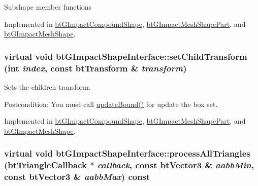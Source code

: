 Subshape member functions 

Implemented in \hyperlink{classbt_g_impact_compound_shape_861967c52cb52a358b8d99aa4c65e306}{btGImpactCompoundShape}, \hyperlink{classbt_g_impact_mesh_shape_part_5ff615b55a2bdaeba511fb116a9ab546}{btGImpactMeshShapePart}, and \hyperlink{classbt_g_impact_mesh_shape_cd958461b4f7802e5bceed2db87c4ff0}{btGImpactMeshShape}.\hypertarget{classbt_g_impact_shape_interface_83392f97bd7dfeb71ccdce6913a465b0}{
\subsubsection[setChildTransform]{\setlength{\rightskip}{0pt plus 5cm}virtual void btGImpactShapeInterface::setChildTransform (int {\em index}, \/  const btTransform \& {\em transform})}}
\label{classbt_g_impact_shape_interface_83392f97bd7dfeb71ccdce6913a465b0}


Sets the children transform. 

\begin{Desc}
\item[Postcondition:]You must call \hyperlink{classbt_g_impact_shape_interface_cb26c2d7a2aecabd06b996b72b848492}{updateBound()} for update the box set. \end{Desc}


Implemented in \hyperlink{classbt_g_impact_compound_shape_560410e20842ad73227d7712a574385c}{btGImpactCompoundShape}, \hyperlink{classbt_g_impact_mesh_shape_part_0a97d3769fb7d3f583e41da6b284bcc1}{btGImpactMeshShapePart}, and \hyperlink{classbt_g_impact_mesh_shape_274feed3c9a38a6af5c9f1141ae9ac1a}{btGImpactMeshShape}.\hypertarget{classbt_g_impact_shape_interface_2faf9adce39854a9a66dd658f646be25}{
\subsubsection[processAllTriangles]{\setlength{\rightskip}{0pt plus 5cm}virtual void btGImpactShapeInterface::processAllTriangles ({\bf btTriangleCallback} $\ast$ {\em callback}, \/  const btVector3 \& {\em aabbMin}, \/  const btVector3 \& {\em aabbMax}) const}}
\label{classbt_g_impact_shape_interface_2faf9adce39854a9a66dd658f646be25}


